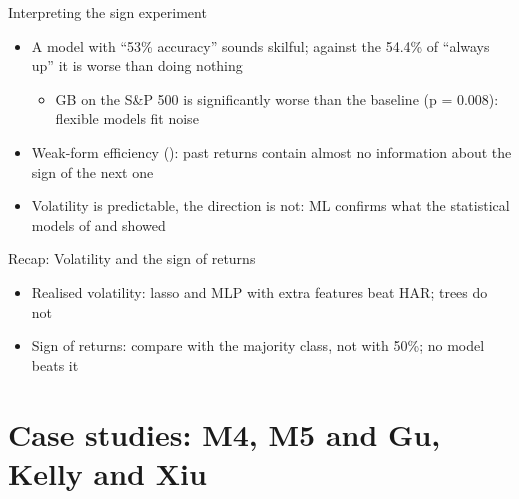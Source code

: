 \begin{frame}{Interpreting the sign experiment}
\itemsize{\small}
\begin{itemize}
    \item A model with ``53\% accuracy'' sounds skilful; against the 54.4\% of ``always up'' it is worse than doing nothing
    \begin{itemize}
        \item GB on the S\&P 500 is significantly worse than the baseline (p = 0.008): flexible models fit noise
    \end{itemize}
    \item Weak-form efficiency (): past returns contain almost no information about the sign of the next one
    \item Volatility is predictable, the direction is not: ML confirms what the statistical models of  and  showed
\end{itemize}
\end{frame}

\begin{frame}{Recap: Volatility and the sign of returns}
\itemsize{\small}
\begin{itemize}
    \item Realised volatility: lasso and MLP with extra features beat HAR; trees do not
    \item Sign of returns: compare with the majority class, not with 50\%; no model beats it
\end{itemize}
\end{frame}


\section{Case studies: M4, M5 and Gu, Kelly and Xiu}

